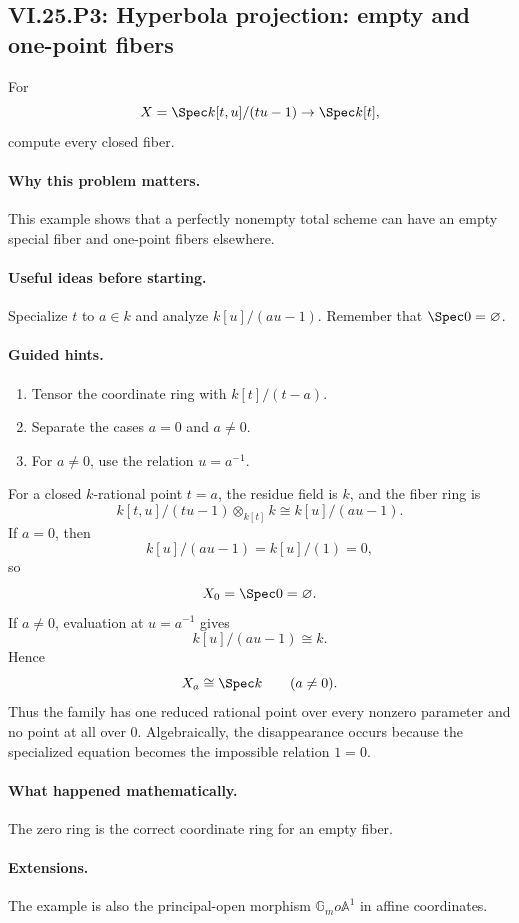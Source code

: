 \subsection*{VI.25.P3: Hyperbola projection: empty and one-point fibers}
\begin{problem}\label{prob:vi25-p03}
For
\[
X=\Spec k[t,u]/(tu-1)\to\Spec k[t],
\]
compute every closed fiber.
\end{problem}

\ifdefined\FullProblemDossiers
\paragraph{Why this problem matters.}
This example shows that a perfectly nonempty total scheme can have an empty special fiber and one-point fibers elsewhere.

\paragraph{Useful ideas before starting.}
Specialize \(t\) to \(a\in k\) and analyze \(k[u]/(au-1)\).  Remember that \(\Spec 0=\varnothing\).

\paragraph{Guided hints.}
\begin{enumerate}
\item Tensor the coordinate ring with \(k[t]/(t-a)\).
\item Separate the cases \(a=0\) and \(a\ne0\).
\item For \(a\ne0\), use the relation \(u=a^{-1}\).
\end{enumerate}

\begin{solution}
For a closed \(k\)-rational point \(t=a\), the residue field is \(k\), and the fiber ring is
\[
k[t,u]/(tu-1)\otimes_{k[t]}k
\cong
k[u]/(au-1).
\]
If \(a=0\), then
\[
k[u]/(au-1)=k[u]/(1)=0,
\]
so
\[
X_0=\Spec 0=\varnothing.
\]
If \(a\ne0\), evaluation at \(u=a^{-1}\) gives
\[
k[u]/(au-1)\cong k.
\]
Hence
\[
X_a\cong\Spec k
\qquad (a\ne0).
\]
Thus the family has one reduced rational point over every nonzero parameter and no point at all over \(0\).  Algebraically, the disappearance occurs because the specialized equation becomes the impossible relation \(1=0\).
\end{solution}

\paragraph{What happened mathematically.}
The zero ring is the correct coordinate ring for an empty fiber.

\paragraph{Extensions.}
The example is also the principal-open morphism \(\mathbb G_m	o\mathbb A^1\) in affine coordinates.
\fi
